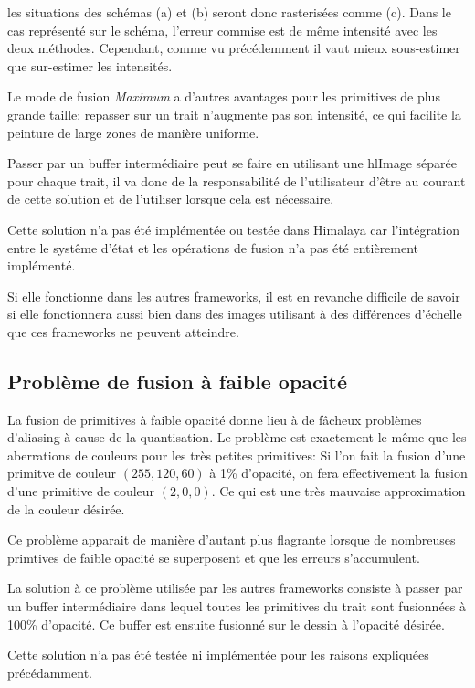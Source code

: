 			les situations des schémas (a) et (b) seront donc rasterisées comme (c). Dans le cas représenté sur le schéma, 
			l'erreur commise est de même intensité avec les deux méthodes. Cependant, comme vu précédemment il vaut mieux
			sous-estimer que sur-estimer les intensités. 

			Le mode de fusion \emph{Maximum} a d'autres avantages pour les primitives de plus grande taille: repasser 
			sur un trait n'augmente pas son intensité, ce qui facilite la peinture de large zones de manière uniforme. 

			Passer par un buffer intermédiaire peut se faire en utilisant une hlImage séparée pour chaque trait, il va
			donc de la responsabilité de l'utilisateur d'être au courant de cette solution et de l'utiliser lorsque cela
			est nécessaire. 
			
			Cette solution n'a pas été implémentée ou testée dans Himalaya car l'intégration entre le systême d'état et
			les opérations de fusion n'a pas été entièrement implémenté. 
			
			Si elle fonctionne dans les autres frameworks, il est en revanche difficile de savoir si elle fonctionnera 
			aussi bien dans des images utilisant à des différences d'échelle que ces frameworks ne peuvent atteindre. 
			
		\subsection{Problème de fusion à faible opacité}
			La fusion de primitives à faible opacité donne lieu à de fâcheux problèmes d'aliasing à cause de la quantisation.
			Le problème est exactement le même que les aberrations de couleurs pour les très petites primitives: Si l'on
			fait la fusion d'une primitve de couleur $(255,120,60)$ à 1\% d'opacité, on fera effectivement la fusion d'une
			primitive de couleur $(2,0,0)$. Ce qui est une très mauvaise approximation de la couleur désirée. 
			
			Ce problème apparait de manière d'autant plus flagrante lorsque de nombreuses primtives de faible opacité se
			superposent et que les erreurs s'accumulent. 

			La solution à ce problème utilisée par les autres frameworks consiste à passer par un buffer intermédiaire 
			dans lequel toutes les primitives du trait sont fusionnées à 100\% d'opacité. Ce buffer est ensuite fusionné
			sur le dessin à l'opacité désirée. 

			Cette solution n'a pas été testée ni implémentée pour les raisons expliquées précédamment.  

